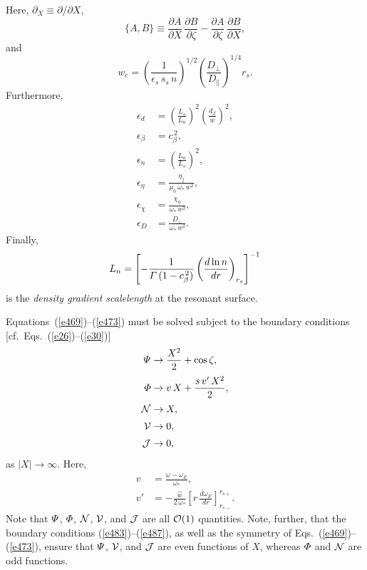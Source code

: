 \documentclass[12pt,prb,aps]{revtex4-1}
\begin{document}
Here,  $\partial_X\equiv \partial/\partial X$, 
\begin{equation}
\{A,B\} \equiv \frac{\partial A}{\partial X}\,\frac{\partial B}{\partial\zeta} - \frac{\partial A}{\partial \zeta}\,\frac{\partial B}{\partial X},
\end{equation}
and
\begin{equation}
w_c = \left(\frac{1}{\epsilon_s\,s_s\,n}\right)^{1/2}\left(\frac{D_\perp}{D_\parallel}\right)^{1/4}r_s.
\end{equation}
Furthermore,
\begin{align}
\epsilon_d &= \left(\frac{L_s}{L_n}\right)^2\left(\frac{d_\beta}{w}\right)^2,\label{e479}\\[0.5ex]
\epsilon_\beta &= c_\beta^{\,2},\label{e480}\\[0.5ex]
\epsilon_n&= \left(\frac{L_n}{L_s}\right)^2,\\[0.5ex]
\epsilon_\eta &= \frac{\eta_\parallel}{\mu_0\,\omega_\ast\,w^2},\label{e481}\\[0.5ex]
\epsilon_\chi &= \frac{\chi_\phi}{\omega_\ast\,w^2},\label{e482}\\[0.5ex]
\epsilon_D &= \frac{D_\perp}{\omega_\ast\,w^2}.
\end{align}
Finally,
\begin{equation}
L_n= \left[-\frac{1}{{\mit\Gamma}\,(1-c_\beta^{\,2})}\left(\frac{d\ln n}{dr}\right)_{r_s}\right]^{-1}
\end{equation}
is the {\em density gradient scalelength}\/  at the resonant surface. 

Equations~(\ref{e469})--(\ref{e473}) must be solved subject to the boundary conditions [cf.\ Eqs.~(\ref{e26})--(\ref{e30})] 
\begin{align}
{\mit\Psi}&\rightarrow \frac{X^{2}}{2} + \cos\zeta,\label{e483}\\[0.5ex]
{\mit\Phi} &\rightarrow v\,X +\frac{ s\,v'\,X^{2}}{2},\label{e484}\\[0.5ex]
{\cal N}&\rightarrow X,\label{e486}\\[0.5ex]
{\cal V}&\rightarrow 0,\label{e486a}\\[0.5ex]
{\cal J}& \rightarrow 0,\label{e487}
\end{align}
as $|X|\rightarrow\infty$.  Here,
\begin{align}
v &= \frac{\omega-\omega_E}{\omega_\ast},\label{e488}\\[0.5ex]
v' &= -\frac{\hat{w}}{2\,\omega_\ast}\left[r\,\frac{d\omega_E}{dr}\right]_{r_{s-}}^{r_{s+}}.\label{e489}
\end{align}
Note that ${\mit\Psi}$, ${\mit\Phi}$, ${\cal N}$, ${\cal V}$, and ${\cal J}$ are all ${\cal O}(1)$ quantities.
Note, further,  that the boundary conditions (\ref{e483})--(\ref{e487}),
as well as the symmetry of Eqs.~(\ref{e469})--(\ref{e473}), ensure that ${\mit\Psi}$, ${\cal V}$, and
${\cal J}$ are even functions of $X$, whereas ${\mit\Phi}$ and ${\cal N}$ are odd functions. 
\end{document}
